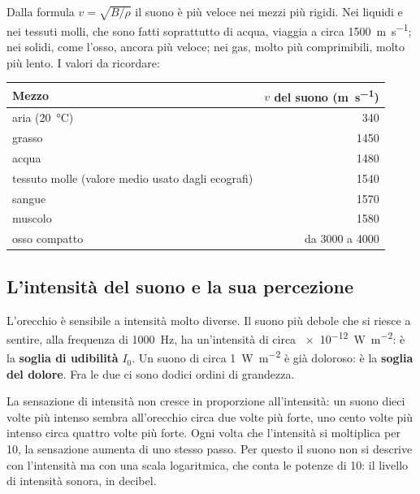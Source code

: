 Dalla formula $v = \sqrt{B/\rho}$ il suono è più veloce nei mezzi più rigidi. Nei liquidi e nei tessuti molli, che sono fatti soprattutto di acqua, viaggia a circa \SI{1500}{\metre\per\second}; nei solidi, come l'osso, ancora più veloce; nei gas, molto più comprimibili, molto più lento. I valori da ricordare:

\begin{center}
\small
\begin{tabular}{@{}l r@{}}
\toprule
Mezzo & $v$ del suono (\si{\metre\per\second}) \\
\midrule
aria (\SI{20}{\celsius}) & 340 \\
grasso & 1450 \\
acqua & 1480 \\
tessuto molle (valore medio usato dagli ecografi) & 1540 \\
sangue & 1570 \\
muscolo & 1580 \\
osso compatto & da 3000 a 4000 \\
\bottomrule
\end{tabular}
\end{center}

\subsection{L'intensità del suono e la sua percezione}

L'orecchio è sensibile a intensità molto diverse. Il suono più debole che si riesce a sentire, alla frequenza di \SI{1000}{\hertz}, ha un'intensità di circa \SI{e-12}{\watt\per\metre\squared}: è la \textbf{soglia di udibilità} $I_0$. Un suono di circa \SI{1}{\watt\per\metre\squared} è già doloroso: è la \textbf{soglia del dolore}. Fra le due ci sono dodici ordini di grandezza.

La sensazione di intensità non cresce in proporzione all'intensità: un suono dieci volte più intenso sembra all'orecchio circa due volte più forte, uno cento volte più intenso circa quattro volte più forte. Ogni volta che l'intensità si moltiplica per 10, la sensazione aumenta di uno stesso passo. Per questo il suono non si descrive con l'intensità ma con una scala logaritmica, che conta le potenze di 10: il livello di intensità sonora, in decibel.

